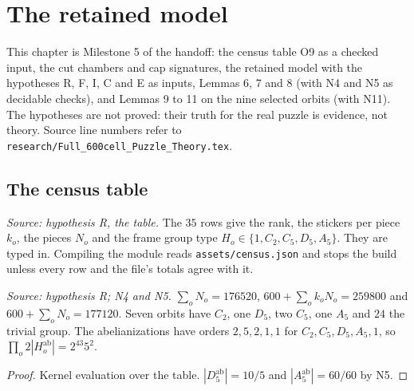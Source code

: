 \chapter{The retained model}
\label{ch:ArchonFull600Theory_RetainedModel}

This chapter is Milestone 5 of the handoff: the census table O9 as a
checked input, the cut chambers and cap signatures, the retained model
with the hypotheses R, F, I, C and E as inputs, Lemmas 6, 7 and 8 (with N4
and N5 as decidable checks), and Lemmas 9 to 11 on the nine selected
orbits (with N11). The hypotheses are not proved: their truth for the
real puzzle is evidence, not theory. Source line numbers refer to
\texttt{research/Full\_600cell\_Puzzle\_Theory.tex}.

\section{The census table}

\begin{definition}
  \label{def:census}
  \leanok
  \textit{Source: hypothesis R, the table.}
  The \(35\) rows give the rank, the stickers per piece \(k_o\), the
  pieces \(N_o\) and the frame group type \(H_o\in\{1,C_2,C_5,D_5,A_5\}\).
  They are typed in. Compiling the module reads
  \texttt{assets/census.json} and stops the build unless every row and
  the file's totals agree with it.
\end{definition}

\begin{lemma}
  \label{lem:census-sums}
  \leanok
  \textit{Source: hypothesis R; N4 and N5.}
  \(\sum_oN_o=176520\), \(600+\sum_ok_oN_o=259800\) and
  \(600+\sum_oN_o=177120\). Seven orbits have \(C_2\), one \(D_5\), two
  \(C_5\), one \(A_5\) and \(24\) the trivial group. The abelianizations
  have orders \(2,5,2,1,1\) for \(C_2,C_5,D_5,A_5,1\), so
  \(\prod_o2|H_o^{\mathrm{ab}}|=2^{43}5^2\).
\end{lemma}
\begin{proof}
  \leanok
  Kernel evaluation over the table. \(|D_5^{\mathrm{ab}}|=10/5\) and
  \(|A_5^{\mathrm{ab}}|=60/60\) by N5.
\end{proof}

